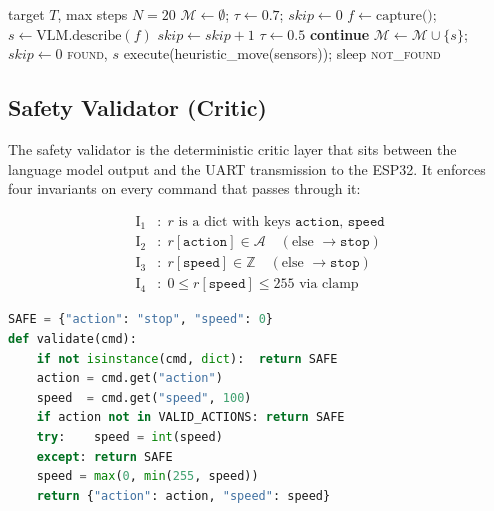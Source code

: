 \documentclass[conference]{IEEEtran}
\newcommand{\safe}{\texttt{stop}}
\begin{document}
\begin{algorithm}[t]
\caption{Episodic visual search (VLM-driven)}
\label{alg:search}
\begin{algorithmic}[1]
\REQUIRE target $T$, max steps $N{=}20$
\STATE $\mathcal{M} \leftarrow \emptyset$; $\tau \leftarrow 0.7$; $\mathit{skip} \leftarrow 0$
  \STATE $f \leftarrow \text{capture()}$;
         $s \leftarrow \text{VLM.describe}(f)$
    \STATE $\mathit{skip} \leftarrow \mathit{skip} + 1$
      \STATE $\tau \leftarrow 0.5$
    \ENDIF
    \STATE \textbf{continue}
  \ENDIF
  \STATE $\mathcal{M} \leftarrow \mathcal{M} \cup \{s\}$; $\mathit{skip} \leftarrow 0$
    \RETURN \textsc{found}, $s$
  \ENDIF
  \STATE execute(heuristic\_move(sensors)); sleep
\ENDFOR
\RETURN \textsc{not\_found}
\end{algorithmic}
\end{algorithm}

\subsection{Safety Validator (Critic)}
\label{sec:validator}

The safety validator is the deterministic critic layer that sits between the language model output and the UART transmission to the ESP32. It enforces four invariants on every command that passes through it:

\begin{align}
\text{I}_1&: \; r \text{ is a dict with keys } \texttt{action},\, \texttt{speed} \label{inv:dict}\\
\text{I}_2&: \; r[\texttt{action}] \in \mathcal{A} \quad(\text{else } \to \safe{}) \label{inv:action}\\
\text{I}_3&: \; r[\texttt{speed}] \in \mathbb{Z} \quad(\text{else } \to \safe{}) \label{inv:int}\\
\text{I}_4&: \; 0 \leq r[\texttt{speed}] \leq 255 \text{ via clamp} \label{inv:range}
\end{align}

\begin{lstlisting}[language=Python, caption={Critic $V$: total, safe output (matches \texttt{safety\_validator.py})},
  label={lst:validator}, float=tp]
SAFE = {"action": "stop", "speed": 0}
def validate(cmd):
    if not isinstance(cmd, dict):  return SAFE
    action = cmd.get("action")
    speed  = cmd.get("speed", 100)
    if action not in VALID_ACTIONS: return SAFE
    try:    speed = int(speed)
    except: return SAFE
    speed = max(0, min(255, speed))
    return {"action": action, "speed": speed}
\end{lstlisting}
\end{document}
